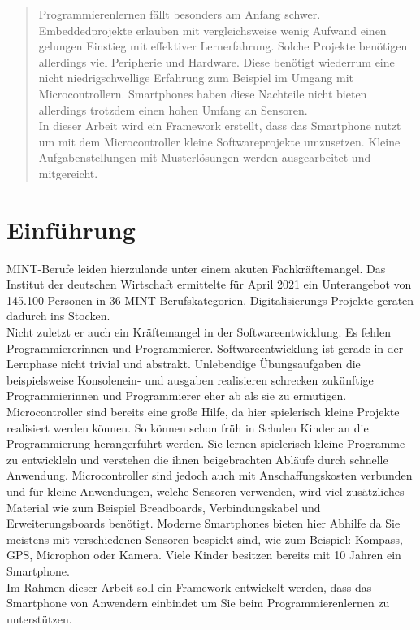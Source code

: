 \documentclass[11pt,a4paper]{report}
\begin{document}

\begin{abstract}
  Programmierenlernen fällt besonders am Anfang schwer.
  Embeddedprojekte erlauben mit vergleichsweise wenig Aufwand einen gelungen Einstieg mit effektiver Lernerfahrung.
  Solche Projekte benötigen allerdings viel Peripherie und Hardware.
  Diese benötigt wiederrum eine nicht niedrigschwellige Erfahrung zum Beispiel im Umgang mit Microcontrollern.
  Smartphones haben diese Nachteile nicht bieten allerdings trotzdem einen hohen Umfang an Sensoren.
  \\
  In dieser Arbeit wird ein Framework erstellt, dass das Smartphone nutzt um mit dem Microcontroller kleine Softwareprojekte umzusetzen.
  Kleine Aufgabenstellungen mit Musterlösungen werden ausgearbeitet und mitgereicht.
\end{abstract}

\tableofcontents

\chapter{Einführung} \label{chap:intro}
MINT-Berufe leiden hierzulande unter einem akuten Fachkräftemangel.
Das Institut der deutschen Wirtschaft ermittelte für April 2021 ein Unterangebot von 145.100 Personen \cite{mint_jahresreport} in 36 MINT-Berufskategorien. 
Digitalisierungs-Projekte geraten dadurch ins Stocken.
\\
Nicht zuletzt er auch ein Kräftemangel in der Softwareentwicklung.
Es fehlen Programmiererinnen und Programmierer.
Softwareentwicklung ist gerade in der Lernphase nicht trivial und abstrakt.
Unlebendige Übungsaufgaben die beispielsweise Konsolenein- und ausgaben realisieren schrecken zukünftige Programmierinnen und Programmierer eher ab als sie zu ermutigen.
\\
Microcontroller sind bereits eine große Hilfe, da hier spielerisch kleine Projekte realisiert werden können.
So können schon früh in Schulen Kinder an die Programmierung herangerführt werden.
Sie lernen spielerisch kleine Programme zu entwickleln und verstehen die ihnen beigebrachten Abläufe durch schnelle Anwendung.
Microcontroller sind jedoch auch mit Anschaffungskosten verbunden und für kleine Anwendungen, welche Sensoren verwenden, wird viel zusätzliches Material wie zum Beispiel Breadboards, Verbindungskabel und Erweiterungsboards benötigt.
Moderne Smartphones bieten hier Abhilfe da Sie meistens mit verschiedenen Sensoren bespickt sind, wie zum Beispiel: Kompass, GPS, Microphon oder Kamera.
Viele Kinder besitzen bereits mit 10 Jahren \cite{bitkom_smartphones} ein Smartphone. 
\\
Im Rahmen dieser Arbeit soll ein Framework entwickelt werden, dass das Smartphone von Anwendern einbindet um Sie beim Programmierenlernen zu unterstützen.
\end{document}
